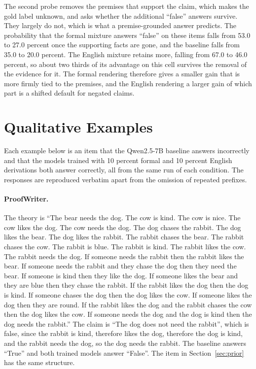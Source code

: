 The second probe removes the premises that support the claim, which makes
the gold label unknown, and asks whether the additional ``false'' answers
survive. They largely do not, which is what a premise-grounded answer
predicts. The probability that the formal mixture answers ``false'' on these
items falls from 53.0 to 27.0 percent once the supporting facts are gone, and the
baseline falls from 35.0 to 20.0 percent. The English mixture retains more, falling
from 67.0 to 46.0 percent, so about two thirds of its advantage on this cell
survives the removal of the evidence for it. The formal rendering therefore
gives a smaller gain that is more firmly tied to the premises, and the
English rendering a larger gain of which part is a shifted default for
negated claims.

\section{Qualitative Examples}
\label{sec:examples}

Each example below is an item that the Qwen2.5-7B baseline answers
incorrectly and that the models trained with 10 percent formal and 10
percent English derivations both answer correctly, all from the same run
of each condition. The
responses are reproduced verbatim apart from the omission of repeated
prefixes.

\paragraph{ProofWriter.} The theory is ``The bear needs the dog. The cow is
kind. The cow is nice. The cow likes the dog. The cow needs the dog. The dog
chases the rabbit. The dog likes the bear. The dog likes the rabbit. The
rabbit chases the bear. The rabbit chases the cow. The rabbit is blue. The
rabbit is kind. The rabbit likes the cow. The rabbit needs the dog. If
someone needs the rabbit then the rabbit likes the bear. If someone needs the
rabbit and they chase the dog then they need the bear. If someone is kind
then they like the dog. If someone likes the bear and they are blue then
they chase the rabbit. If the rabbit likes the dog then the dog is kind. If
someone chases the dog then the dog likes the cow. If someone likes the dog
then they are round. If the rabbit likes the dog and the rabbit chases the
cow then the dog likes the cow. If someone needs the dog and the dog is kind
then the dog needs the rabbit.'' The claim is ``The dog does not need the
rabbit'', which is false, since the rabbit is kind, therefore likes the dog,
therefore the dog is kind, and the rabbit needs the dog, so the dog needs
the rabbit. The baseline answers ``True'' and both trained models answer
``False''. The item in Section~\ref{sec:prior} has the same structure.

